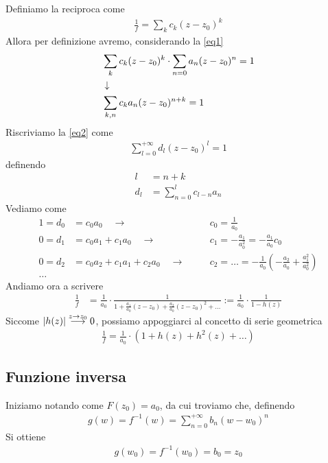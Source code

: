 Definiamo la reciproca come
\begin{align}
	\frac{1}{f} = \sum_{k} c_k (z-z_0)^k
\end{align}
Allora per definizione avremo, considerando la \ref{eq1}
\begin{align}
	&\sum_{k} c_k (z-z_0)^k \cdot \sum_{n=0} a_n (z-z_0)^n = 1\\ &\downarrow \nonumber \\
	&\sum_{k,n} c_ka_n (z-z_0)^{n+k} = 1 \label{eq2}
\end{align}
Riscriviamo la \ref{eq2} come
\begin{align}
	\sum_{l=0}^{+\infty} d_l (z-z_0)^l = 1
\end{align}
definendo
\begin{align}
	l &= n+k\\
	d_l &= \sum_{n=0}^{l}c_{l-n}a_n
\end{align}
Vediamo come
\begin{align}
	1 = d_0 &= c_0a_0 \quad \rightarrow& \quad &c_0 = \frac{1}{a_0}\\
	0 = d_1 &= c_0a_1 + c_1a_0 \quad \rightarrow& \quad &c_1 = -\frac{a_1}{a_0^2} = -\frac{a_1}{a_0} c_0\\
	0 = d_2 &= c_0a_2 + c_1a_1 + c_2a_0 \quad \rightarrow& \quad &c_2 = \dots = -\frac{1}{a_0}\left( -\frac{a_2}{a_0} + \frac{a_1^2}{a_0^2} \right) \\
	\dots \nonumber
\end{align}
Andiamo ora a scrivere
\begin{align}
	\frac{1}{f} &= \frac{1}{a_0}\cdot \frac{1}{1 + \frac{a_1}{a_0}(z-z_0) + \frac{a_2}{a_0} (z-z_0)^2 + \dots} := \frac{1}{a_0} \cdot \frac{1}{1-h(z)}
\end{align}
Siccome $|h(z)| \overset{z \rightarrow z_0}{\longrightarrow} 0$, possiamo appoggiarci al concetto di serie geometrica
\begin{align}
	\frac{1}{f} = \frac{1}{a_0}\cdot (1 + h(z) + h^2(z) + \dots)
\end{align}

\subsection{Funzione inversa}

Iniziamo notando come $F(z_0) = a_0$, da cui troviamo che, definendo
\begin{align}
	g(w) = f^{-1}(w) = \sum_{n=0}^{+\infty} b_n(w-w_0)^n
\end{align}
Si ottiene
\begin{align}
	g(w_0) = f^{-1}(w_0) = b_0 = z_0
\end{align}

